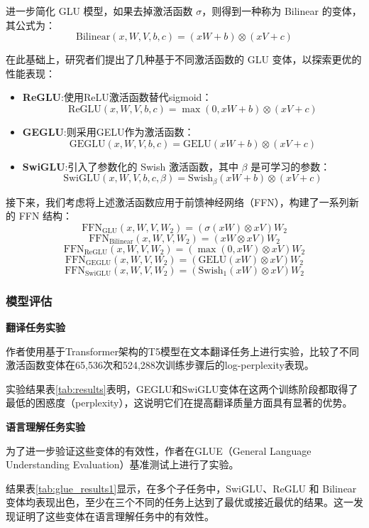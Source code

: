     进一步简化 GLU 模型，如果去掉激活函数 $ \sigma $，则得到一种称为 Bilinear 的变体，其公式为：
    $$
    \text{Bilinear}(x, W, V, b, c) = (xW + b) \otimes (xV + c)
    $$
    
    在此基础上，研究者们提出了几种基于不同激活函数的 GLU 变体，以探索更优的性能表现：
    \begin{itemize}
    	\item \textbf{ReGLU}:使用ReLU激活函数替代sigmoid：
    	$$
    	\text{ReGLU}(x, W, V, b, c) = \max(0, xW + b) \otimes (xV + c)
    	$$
    	
    	\item \textbf{GEGLU}:则采用GELU作为激活函数：
    	$$
    	\text{GEGLU}(x, W, V, b, c) = \text{GELU}(xW + b) \otimes (xV + c)
    	$$
    	
    	\item \textbf{SwiGLU}:引入了参数化的 Swish 激活函数，其中 $ \beta $ 是可学习的参数：
    	$$
    	\text{SwiGLU}(x, W, V, b, c, \beta) = \text{Swish}_\beta(xW + b) \otimes (xV + c)
    	$$
    \end{itemize}
    
    接下来，我们考虑将上述激活函数应用于前馈神经网络（FFN），构建了一系列新的 FFN 结构：
    $$
    \text{FFN}_{\text{GLU}}(x, W, V, W_2) = (\sigma(xW) \otimes xV) W_2
    $$
    $$
    \text{FFN}_{\text{Bilinear}}(x, W, V, W_2) = (xW \otimes xV) W_2
    $$
    $$
    \text{FFN}_{\text{ReGLU}}(x, W, V, W_2) = (\max(0, xW) \otimes xV) W_2
    $$
    $$
    \text{FFN}_{\text{GEGLU}}(x, W, V, W_2) = (\text{GELU}(xW) \otimes xV) W_2
    $$
    $$
    \text{FFN}_{\text{SwiGLU}}(x, W, V, W_2) = (\text{Swish}_1(xW) \otimes xV) W_2
    $$
\subsubsection{模型评估}
\noindent\textbf{翻译任务实验}

    作者使用基于Transformer架构的T5模型在文本翻译任务上进行实验，比较了不同激活函数变体在65,536次和524,288次训练步骤后的log-perplexity表现。
    
    实验结果表\ref{tab:results}表明，GEGLU和SwiGLU变体在这两个训练阶段都取得了最低的困惑度（perplexity），这说明它们在提高翻译质量方面具有显著的优势。
    
    
\noindent\textbf{语言理解任务实验}

    为了进一步验证这些变体的有效性，作者在GLUE（General Language Understanding Evaluation）基准测试上进行了实验。
    
    结果表\ref{tab:glue_results1}显示，在多个子任务中，SwiGLU、ReGLU 和 Bilinear 变体均表现出色，至少在三个不同的任务上达到了最优或接近最优的结果。这一发现证明了这些变体在语言理解任务中的有效性。
    
